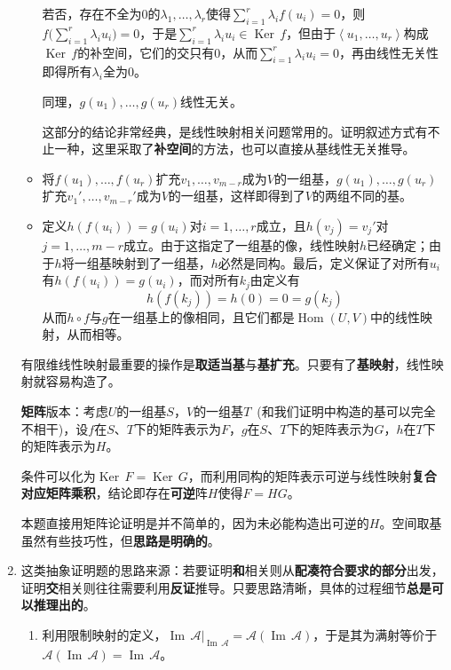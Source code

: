 \documentclass[a4paper,UTF8,fontset=windows,AutoFakeBold]{ctexart}
\DeclareMathOperator{\im}{Im\,}
\DeclareMathOperator{\Ker}{Ker\,}
\DeclareMathOperator{\Hom}{Hom}
\newcommand*{\ma}{\mathcal{A}}
\newcommand*{\note}{\noindent *}
\begin{document}
\begin{enumerate}
\begin{itemize}
        若否，存在不全为0的$\lambda_1,\dots,\lambda_r$使得$\sum_{i=1}^r\lambda_if(u_i)=0$，则$f\big(\sum_{i=1}^r\lambda_iu_i\big)=0$，于是$\sum_{i=1}^r\lambda_iu_i\in\Ker f$，但由于$\left<u_1,\dots,u_r\right>$构成$\Ker f$的补空间，它们的交只有0，从而$\sum_{i=1}^r\lambda_iu_i=0$，再由线性无关性即得所有$\lambda_i$全为0。

        同理，$g(u_1),\dots,g(u_r)$线性无关。

        \note 这部分的结论非常经典，是线性映射相关问题常用的。证明叙述方式有不止一种，这里采取了\textbf{补空间}的方法，也可以直接从基线性无关推导。
        
        \item 将$f(u_1),\dots,f(u_r)$扩充$v_1,\dots,v_{m-r}$成为$V$的一组基，$g(u_1),\dots,g(u_r)$扩充$v_1',\dots,v_{m-r}'$成为$V$的一组基，这样即得到了$V$的两组不同的基。
        
        \item 定义$h(f(u_i))=g(u_i)$对$i=1,\dots,r$成立，且$h(v_j)=v_j'$对$j=1,\dots,m-r$成立。由于这指定了一组基的像，线性映射$h$已经确定；由于$h$将一组基映射到了一组基，$h$必然是同构。最后，定义保证了对所有$u_i$有$h(f(u_i))=g(u_i)$，而对所有$k_j$由定义有
        $$h(f(k_j))=h(0)=0=g(k_j)$$
        从而$h\circ f$与$g$在一组基上的像相同，且它们都是$\Hom(U,V)$中的线性映射，从而相等。
    \end{itemize}

    \note 有限维线性映射最重要的操作是\textbf{取适当基}与\textbf{基扩充}。只要有了\textbf{基映射}，线性映射就容易构造了。

    \textbf{矩阵}版本：考虑$U$的一组基$S$，$V$的一组基$T$\ (和我们证明中构造的基可以完全不相干)，设$f$在$S$、$T$下的矩阵表示为$F$，$g$在$S$、$T$下的矩阵表示为$G$，$h$在$T$下的矩阵表示为$H$。

    条件可以化为$\Ker F=\Ker G$，而利用同构的矩阵表示可逆与线性映射\textbf{复合对应矩阵乘积}，结论即存在\textbf{可逆}阵$H$使得$F=HG$。

    \note 本题直接用矩阵论证明是并不简单的，因为未必能构造出可逆的$H$。空间取基虽然有些技巧性，但\textbf{思路是明确的}。

    \item
    \note 这类抽象证明题的思路来源：若要证明\textbf{和}相关则从\textbf{配凑符合要求的部分}出发，证明\textbf{交}相关则往往需要利用\textbf{反证}推导。只要思路清晰，具体的过程细节\textbf{总是可以推理出的}。
    
    \begin{enumerate}
        \item 
        利用限制映射的定义，$\im\ma|_{\im\ma}=\ma(\im\ma)$，于是其为满射等价于$\ma(\im\ma)=\im\ma$。


\end{enumerate}
\end{enumerate}
\end{document}

